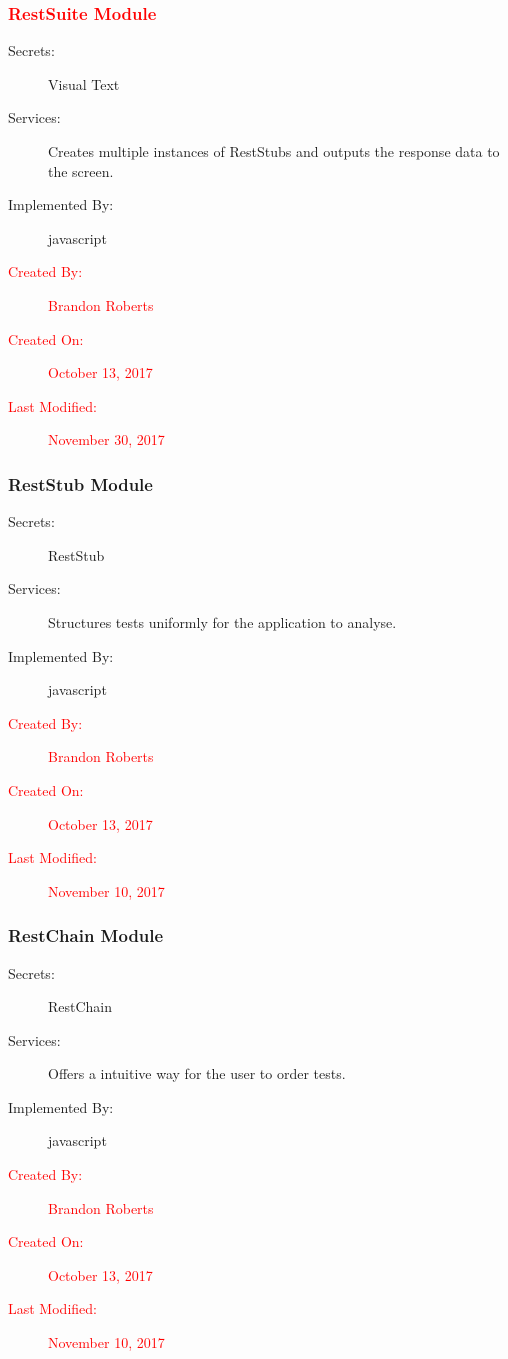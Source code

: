 \documentclass[12pt, titlepage]{article}
\begin{document}
\subsubsection{\textcolor{red}{RestSuite Module}}
\begin{description}
\item[Secrets:] Visual Text
\item[Services:]Creates multiple instances of RestStubs and outputs the response data to the screen.
\item[Implemented By:] javascript
\item[\textcolor{red}{Created By:}] \textcolor{red}{Brandon Roberts}
\item[\textcolor{red}{Created On:}] \textcolor{red}{October 13, 2017}
\item[\textcolor{red}{Last Modified:}] \textcolor{red}{November 30, 2017}
\end{description}

\subsubsection{RestStub Module}
\begin{description}
\item[Secrets:] RestStub
\item[Services:] Structures tests uniformly for the application to analyse.
\item[Implemented By:] javascript
\item[\textcolor{red}{Created By:}] \textcolor{red}{Brandon Roberts}
\item[\textcolor{red}{Created On:}] \textcolor{red}{October 13, 2017}
\item[\textcolor{red}{Last Modified:}] \textcolor{red}{November 10, 2017}
\end{description}

\subsubsection{RestChain Module}
\begin{description}
\item[Secrets:] RestChain
\item[Services:] Offers a intuitive way for the user to order tests.
\item[Implemented By:] javascript
\item[\textcolor{red}{Created By:}] \textcolor{red}{Brandon Roberts}
\item[\textcolor{red}{Created On:}] \textcolor{red}{October 13, 2017}
\item[\textcolor{red}{Last Modified:}] \textcolor{red}{November 10, 2017}
\end{description}
\end{document}
